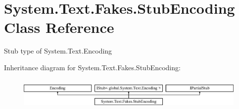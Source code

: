 \hypertarget{class_system_1_1_text_1_1_fakes_1_1_stub_encoding}{\section{System.\-Text.\-Fakes.\-Stub\-Encoding Class Reference}
\label{class_system_1_1_text_1_1_fakes_1_1_stub_encoding}
}


Stub type of System.\-Text.\-Encoding 


Inheritance diagram for System.\-Text.\-Fakes.\-Stub\-Encoding\-:\begin{figure}[H]
\begin{center}
\leavevmode
\includegraphics[height=1.595442cm]{class_system_1_1_text_1_1_fakes_1_1_stub_encoding}
\end{center}
\end{figure}
